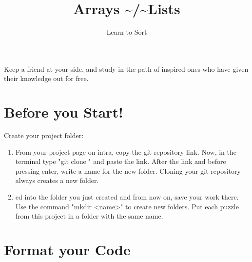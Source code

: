 \documentclass{42-en}
\begin{document}
\title{Arrays \textasciitilde/\textasciitilde Lists}
\subtitle{Learn to Sort}


\summary
{
	Keep a friend at your side, and study in the path of inspired ones who have given their knowledge out for free. 
}

\maketitle

\tableofcontents


\chapter{Before you Start!}

Create your project folder:
	\begin{enumerate}
		\item From your project page on intra, copy the git repository link. Now, in the terminal type "git clone " and paste the link. After the link and before pressing enter, write a name for the new folder. Cloning your git repository always creates a new folder.
		\item cd into the folder you just created and from now on, save your work there. Use the command "mkdir <name>" to create new folders. Put each puzzle from this project in a folder with the same name.
	\end{enumerate}



\chapter{Format your Code}
\end{document}

